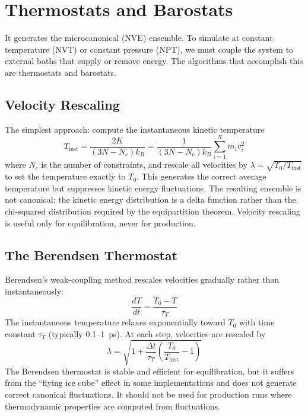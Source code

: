 \section{Thermostats and Barostats}
\label{sec:thermostats-barostats}

 It generates the microcanonical (NVE) ensemble. To simulate at constant temperature (NVT) or constant pressure (NPT), we must couple the system to external baths that supply or remove energy. The algorithms that accomplish this are thermostats and barostats.

\subsection{Velocity Rescaling}
\label{sec:velocity-rescaling}

The simplest approach: compute the instantaneous kinetic temperature
\begin{equation}
\label{eq:kinetic-temp}
T_{\text{inst}} = \frac{2 K}{(3N - N_c) k_B} = \frac{1}{(3N - N_c)k_B} \sum_{i=1}^N m_i v_i^2
\end{equation}
where $N_c$ is the number of constraints, and rescale all velocities by $\lambda = \sqrt{T_0/T_{\text{inst}}}$ to set the temperature exactly to $T_0$. This generates the correct average temperature but suppresses kinetic energy fluctuations. The resulting ensemble is not canonical: the kinetic energy distribution is a delta function rather than the chi-squared distribution required by the equipartition theorem. Velocity rescaling is useful only for equilibration, never for production.

\subsection{The Berendsen Thermostat}
\label{sec:berendsen-thermostat}

Berendsen's weak-coupling method rescales velocities gradually rather than instantaneously:
\begin{equation}
\label{eq:berendsen-t}
\frac{dT}{dt} = \frac{T_0 - T}{\tau_T}
\end{equation}
The instantaneous temperature relaxes exponentially toward $T_0$ with time constant $\tau_T$ (typically 0.1--1~ps). At each step, velocities are rescaled by
\begin{equation}
\label{eq:berendsen-lambda}
\lambda = \sqrt{1 + \frac{\Delta t}{\tau_T}\left(\frac{T_0}{T_{\text{inst}}} - 1\right)}
\end{equation}
The Berendsen thermostat is stable and efficient for equilibration, but it suffers from the ``flying ice cube'' effect in some implementations and does not generate correct canonical fluctuations. It should not be used for production runs where thermodynamic properties are computed from fluctuations.

